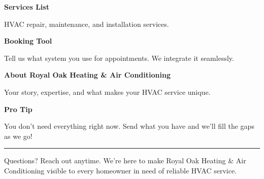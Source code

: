 \documentclass[11pt,letterpaper]{article}
\begin{document}
\hfill
\begin{minipage}[t]{0.48\textwidth}
\begin{tcolorbox}[colframe=accent-teal, boxrule=1pt, left=0.7em, right=0.7em, top=0.5em, bottom=0.5em, arc=4pt, boxsep=0pt]
{\bfseries\small\color{accent-teal}Services List}

\vspace{0.15em}

{\small HVAC repair, maintenance, and installation services.}
\end{tcolorbox}

\vspace{0.1em}

\begin{tcolorbox}[colframe=accent-teal, boxrule=1pt, left=0.7em, right=0.7em, top=0.5em, bottom=0.5em, arc=4pt, boxsep=0pt]
{\bfseries\small\color{accent-teal}Booking Tool}

\vspace{0.15em}

{\small Tell us what system you use for appointments. We integrate it seamlessly.}
\end{tcolorbox}

\vspace{0.1em}

\begin{tcolorbox}[colframe=accent-teal, boxrule=1pt, left=0.7em, right=0.7em, top=0.5em, bottom=0.5em, arc=4pt, boxsep=0pt]
{\bfseries\small\color{accent-teal}About Royal Oak Heating \& Air Conditioning}

\vspace{0.15em}

{\small Your story, expertise, and what makes your HVAC service unique.}
\end{tcolorbox}

\vspace{-0.2em}
\end{minipage}

\vspace{0.15em}

\begin{tcolorbox}[colback={accent-red!5}, colframe=accent-red!20, boxrule=0.5pt, left=0.7em, right=0.7em, top=0.4em, bottom=0.4em, arc=6pt, boxsep=0pt]

{\bfseries\small\color{accent-red}Pro Tip}

\vspace{0.1em}

{\small You don't need everything right now. Send what you have and we'll fill the gaps as we go!}

\end{tcolorbox}

\vspace{0.15em}

\noindent\hrule
\vspace{0.2em}

{\small\color{text-light}Questions? Reach out anytime. We're here to make Royal Oak Heating \& Air Conditioning visible to every homeowner in need of reliable HVAC service.}
\end{document}
